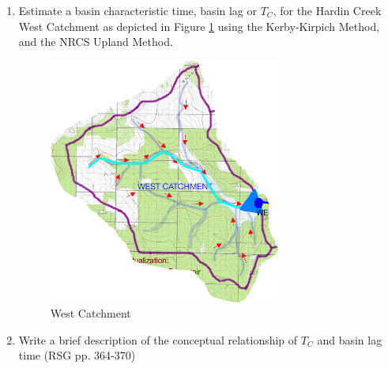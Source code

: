 \documentclass[12pt]{article}
\begin{document}
\begin{enumerate}
\item Estimate a basin characteristic time, basin lag or $T_C$, for the Hardin Creek West Catchment as depicted in Figure \ref{fig:WestCatchment} using the Kerby-Kirpich Method, and the NRCS Upland Method.

\begin{figure}[h!] %
   \centering
   \includegraphics[width=3.0in]{WestCatchment.png} 
   \caption{West Catchment}
   \label{fig:WestCatchment}
\end{figure}

\item Write a brief description of the conceptual relationship of $T_C$ and basin lag time (RSG pp. 364-370)






\end{enumerate}
\end{document}
